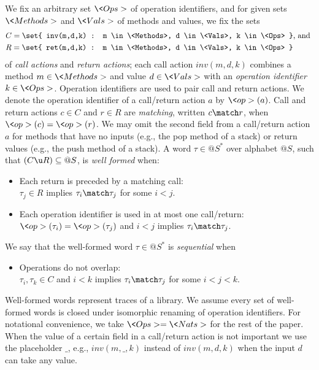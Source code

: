 %
%
%

\noindent
We fix an arbitrary set $\<Ops>$ of operation identifiers, and for given sets
$\<Methods>$ and $\<Vals>$ of methods and values, we fix the sets
\begin{align*}
  & C = \set{ inv(m,d,k) : m \in \<Methods>, d \in \<Vals>, k \in \<Ops> }
  \text{, and } \\
  & R = \set{ ret(m,d,k) : m \in \<Methods>, d \in \<Vals>, k \in \<Ops> }  
\end{align*}
of \emph{call actions} and \emph{return actions}; each call action $inv(m,d,k)$
combines a method $m \in \<Methods>$ and value $d \in \<Vals>$ with an
\emph{operation identifier} $k \in \<Ops>$. Operation identifiers are used to
pair call and return actions. We denote the operation identifier of a
call/return action $a$ by $\<op>(a)$. Call and return actions $c \in C$ and $r
\in R$ are \emph{matching}, written $c \match r$, when $\<op>(c) = \<op>(r)$. 
We may omit the second field from a call/return action $a$ for methods that have no inputs (e.g., the pop method of a stack) or return values (e.g., the push method of a stack).
A word $\tau \in @S^*$ over alphabet $@S$, such that $(C \u R) \subseteq @S$, is
\emph{well formed} when:
\begin{itemize}

  \item Each return is preceded by a matching call: \\
  $\tau_j \in R$ implies $\tau_i \match \tau_j$ for some $i < j$.

  \item Each operation identifier is used in at most one call/return: \\
  $\<op>(\tau_i) = \<op>(\tau_j)$ and $i < j$ implies $\tau_i \match \tau_j$.

\end{itemize}
We say that the well-formed word $\tau \in @S^*$ is \emph{sequential} when
\begin{itemize}

  \item Operations do not overlap: \\
  $\tau_i, \tau_k \in C$ and $i < k$ implies $\tau_i \match \tau_j$ for some $i < j < k$.

\end{itemize}
Well-formed words represent traces of a library. We assume every set of well-formed
words is closed under isomorphic renaming of operation identifiers. For
notational convenience, we take $\<Ops>=\<Nats>$ for the rest of the paper.
When the value of a certain field in a call/return action is not important we use 
the placeholder $\_$, e.g., $inv(m,\_,k)$ instead of $inv(m,d,k)$ when the input  
$d$ can take any value.

